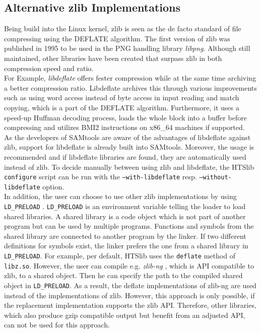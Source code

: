 \subsection{Alternative zlib Implementations}
Being build into the Linux kernel, zlib is seen as the de facto standard of file compressing using the DEFLATE algorithm. The first version of zlib was published in 1995 to be used in the PNG handling library \textit{libpng}. Although still maintained, other libraries have been created that surpass zlib in both compression speed and ratio.\\
For Example, \textit{libdeflate}\cite{biggers_ebiggerslibdeflate_2024} offers fester compression while at the same time archiving a better compression ratio. Libdeflate archives this through various improvements such as using word access instead of byte access in input reading and match copying, which is a part of the DEFLATE algorithm. Furthermore, it uses a speed-up Huffman decoding process, loads the whole block into a buffer before compressing and utilizes BMI2 instructions on x86\_64 machines if supported. \\
As the developers of SAMtools are aware of the advantages of libdeflate against zlib, support for libdeflate is already built into SAMtools. Moreover, the usage is recommended and if libdeflate libraries are found, they are automatically used instead of zlib. To decide manually between using zlib and libdeflate, the HTSlib \texttt{configure} script can be run with the \texttt{--with-libdeflate} resp. \texttt{--without-libdeflate} option. \\
In addition, the user can choose to use other zlib implementations by using \texttt{LD\_PRELOAD} \cite{myers_intercepting_nodate-1}. \texttt{LD\_PRELOAD} is an environment variable telling the loader to load shared libraries. A shared library is a code object which is not part of another program but can be used by multiple programs. Functions and symbols from the shared library are connected to another program by the linker. If two different definitions for symbols exist, the linker prefers the one from a shared library in \texttt{LD\_PRELOAD}. For example, per default, HTSlib uses the \texttt{deflate} method of \texttt{libz.so}. However, the user can compile e.g. \textit{zlib-ng} \cite{noauthor_zlib-ngzlib-ng_2024}, which is API compatible to zlib, to a shared object. Then he can specify the path to the compiled shared object in \texttt{LD\_PRELOAD}. As a result, the deflate implementations of zlib-ng are used instead of the implementations of zlib. However, this approach is only possible, if the replacement implementation supports the zlib API. Therefore, other libraries, which also produce gzip compatible output but benefit from an adjusted API, can not be used for this approach. 

